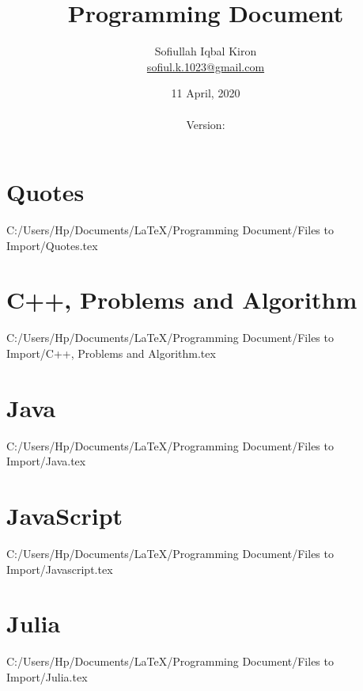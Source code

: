 \documentclass[11 pt]{book}
\title{Programming Document}
\author
{
	Sofiullah Iqbal Kiron\\
	\href{mailto:sofiul.k.1023@gmail.com}{sofiul.k.1023@gmail.com}
}
\date{11 April, 2020 \\ \currenttime \\ Version: \version}
\affil
{
	BSMRSTU, Department of CSE \\
	SHIICT \\
	{\tiny Copyright\faCopyright\hspace{2pt} under Sofiullah Book Agency}
}
\begin{document}
\frontmatter %

\pagecolor{green!90}
\maketitle
\pagecolor{white}
\tableofcontents
\listoffigures
\listoftables
\justify
{
	\raggedleft\vfill\itshape{}\par
}

\mainmatter

\chapter{Quotes}
{C:/Users/Hp/Documents/LaTeX/Programming Document/Files to Import/Quotes.tex}

\chapter{C++, Problems and Algorithm}
{C:/Users/Hp/Documents/LaTeX/Programming Document/Files to Import/C++, Problems and Algorithm.tex}

\chapter{Java}
{C:/Users/Hp/Documents/LaTeX/Programming Document/Files to Import/Java.tex}

\chapter{JavaScript}
{C:/Users/Hp/Documents/LaTeX/Programming Document/Files to Import/Javascript.tex}

\chapter{Julia}
{C:/Users/Hp/Documents/LaTeX/Programming Document/Files to Import/Julia.tex}
\end{document}
